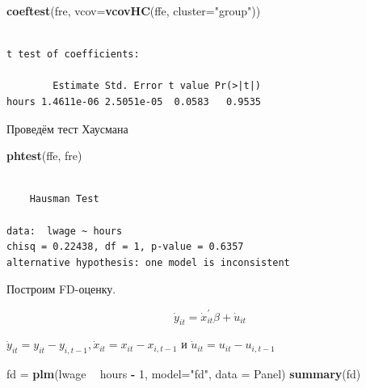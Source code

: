 \documentclass[]{book}
\newenvironment{Shaded}{\begin{snugshade}}{\end{snugshade}}
\newcommand{\DataTypeTok}[1]{\textcolor[rgb]{0.13,0.29,0.53}{#1}}
\newcommand{\DecValTok}[1]{\textcolor[rgb]{0.00,0.00,0.81}{#1}}
\newcommand{\KeywordTok}[1]{\textcolor[rgb]{0.13,0.29,0.53}{\textbf{#1}}}
\newcommand{\NormalTok}[1]{#1}
\newcommand{\OperatorTok}[1]{\textcolor[rgb]{0.81,0.36,0.00}{\textbf{#1}}}
\newcommand{\StringTok}[1]{\textcolor[rgb]{0.31,0.60,0.02}{#1}}
\begin{document}
\begin{Shaded}
\begin{Highlighting}[]
\KeywordTok{coeftest}\NormalTok{(fre, }\DataTypeTok{vcov=}\KeywordTok{vcovHC}\NormalTok{(ffe, }\DataTypeTok{cluster=}\StringTok{"group"}\NormalTok{))}
\end{Highlighting}
\end{Shaded}

\begin{verbatim}

t test of coefficients:

        Estimate Std. Error t value Pr(>|t|)
hours 1.4611e-06 2.5051e-05  0.0583   0.9535
\end{verbatim}

Проведём тест Хаусмана

\begin{Shaded}
\begin{Highlighting}[]
\KeywordTok{phtest}\NormalTok{(ffe, fre)}
\end{Highlighting}
\end{Shaded}

\begin{verbatim}

    Hausman Test

data:  lwage ~ hours
chisq = 0.22438, df = 1, p-value = 0.6357
alternative hypothesis: one model is inconsistent
\end{verbatim}

Построим FD-оценку.

\begin{equation}
\dot{y}_{i t}=\dot{x}_{i t}^{\prime} \beta+\dot{u}_{i t}
\end{equation}

\(\dot{y}_{i t}=y_{i t}-y_{i, t-1}, \dot{x}_{i t}=x_{i t}-x_{i, t-1}\) и \(\dot{u}_{i t}=u_{i t}-u_{i, t-1}\)

\begin{Shaded}
\begin{Highlighting}[]
\NormalTok{fd =}\StringTok{ }\KeywordTok{plm}\NormalTok{(lwage }\OperatorTok{~}\StringTok{ }\NormalTok{hours }\OperatorTok{-}\StringTok{ }\DecValTok{1}\NormalTok{, }\DataTypeTok{model=}\StringTok{"fd"}\NormalTok{, }\DataTypeTok{data =}\NormalTok{ Panel)}
\KeywordTok{summary}\NormalTok{(fd)}
\end{Highlighting}
\end{Shaded}
\end{document}
